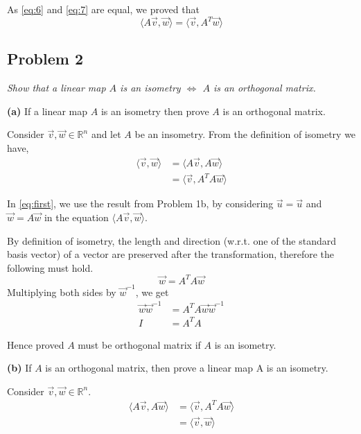\documentclass[12pt,a4paper]{article}
\begin{document}
    As \eqref{eq:6} and \eqref{eq:7} are equal, we proved that
    \begin{equation}
        \langle A\vec{v}, \vec{w} \rangle = \langle \vec{v}, A^T\vec{w} \rangle
    \end{equation}
    \newpage
    
    \subsection*{Problem 2}
    \textit{
        Show that a linear map $A$ is an isometry $\iff$ $A$ is an orthogonal matrix.
    }
    
    \noindent{}
    
    \textbf{(a)} If a linear map $A$ is an isometry then prove $A$ is an orthogonal matrix.
    
    Consider $\vec{v}, \vec{w} \in \mathbb{R}^n$ and let $A$ be an insometry. From the definition of isometry we have,
    \begin{align}
        \langle \vec{v}, \vec{w} \rangle &= \langle A\vec{v}, A\vec{w} \rangle \\
                                         &= \langle \vec{v}, A^TA\vec{w} \rangle \label{eq:first}
    \end{align}
    
    In \eqref{eq:first}, we use the result from Problem 1b, by considering $\vec{u} = \vec{u}$ and $\vec{w} = A\vec{w}$ in the equation $\langle A\vec{v}, \vec{w} \rangle$.
    
    By definition of isometry, the length and direction (w.r.t. one of the standard basis vector) of a vector are preserved after the transformation, therefore the following must hold. $$\vec{w} = A^TA\vec{w}$$ Multiplying both sides by $\vec{w}^{-1}$, we get
    \begin{align*}
        \vec{w}\vec{w}^{-1} &= A^TA\vec{w}\vec{w}^{-1} \\
        I &= A^TA
    \end{align*}
    
    Hence proved $A$ must be orthogonal matrix if $A$ is an isometry.
    
    \vspace{5mm}
    \textbf{(b)} If $A$ is an orthogonal matrix, then prove a linear map A is an isometry.
    
    Consider $\vec{v}, \vec{w} \in \mathbb{R}^n$.
    \begin{align}
    \langle A\vec{v}, A\vec{w} \rangle &= \langle \vec{v}, A^TA\vec{w} \rangle \label{eq:9}\\
    &= \langle \vec{v}, \vec{w} \rangle \label{eq:10}
    \end{align}
    
\end{document}
